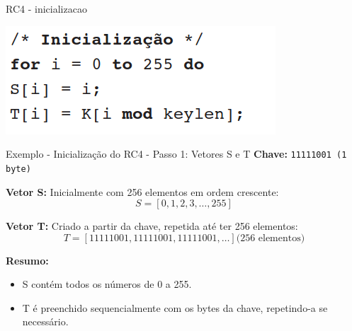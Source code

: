 \begin{frame}{RC4 - inicializacao}



    \includegraphics[width=\linewidth]{Figuras/rc4-inicializacao.png}



\end{frame}

\begin{frame}{Exemplo - Inicialização do RC4 - Passo 1: Vetores S e T}
    \textbf{Chave:} \texttt{11111001 (1 byte)}

    \bigskip

    \textbf{Vetor S:} Inicialmente com 256 elementos em ordem crescente:
    \[
        S = [0, 1, 2, 3, \dots, 255]
    \]

    \textbf{Vetor T:} Criado a partir da chave, repetida até ter 256 elementos:
    \[
        T = [11111001, 11111001, 11111001, \dots] \text{(256 elementos)}
    \]

    \bigskip
    \textbf{Resumo:}
    \begin{itemize}
        \item S contém todos os números de 0 a 255.
        \item T é preenchido sequencialmente com os bytes da chave, repetindo-a se necessário.
    \end{itemize}
\end{frame}


